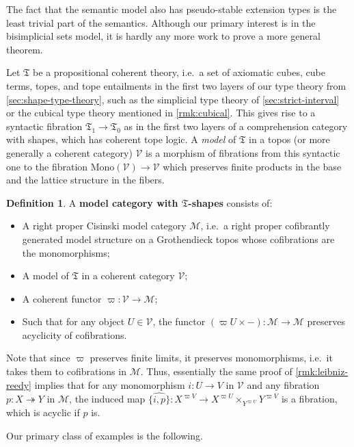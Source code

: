 \documentclass{amsart}
\theoremstyle{plain}
\theoremstyle{definition}
\newtheorem{defn}[thm]{Definition}
\theoremstyle{remark}
\numberwithin{equation}{section}
\newcommand{\M}{\mathcal{M}}
\newcommand{\V}{\mathcal{V}}
\newcommand{\fT}{\mathfrak{T}}
\begin{document}
The fact that the semantic model also has pseudo-stable extension types is the least trivial part of the semantics.
Although our primary interest is in the bisimplicial sets model, it is hardly any more work to prove a more general theorem.

Let $\fT$ be a propositional coherent theory, i.e.\ a set of axiomatic cubes, cube terms, topes, and tope entailments in the first two layers of our type theory from \cref{sec:shape-type-theory}, such as the simplicial type theory of \cref{sec:strict-interval} or the cubical type theory mentioned in \cref{rmk:cubical}.
This gives rise to a syntactic fibration $\fT_1 \to \fT_0$ as in the first two layers of a comprehension category with shapes, which has coherent tope logic.
A \emph{model} of $\fT$ in a topos (or more generally a coherent category) $\V$ is a morphism of fibrations from this syntactic one to the fibration $\mathrm{Mono}(\V) \to \V$ which preserves finite products in the base and the lattice structure in the fibers.

\begin{defn}\label{defn:model-shapes}
  A \textbf{model category with $\fT$-shapes} consists of:
  \begin{itemize}
  \item A right proper Cisinski model category $\M$, i.e.\ a right proper cofibrantly generated model structure on a Grothendieck topos whose cofibrations are the monomorphisms;
  \item A model of $\fT$ in a coherent category $\V$;
  \item A  coherent functor $\varpi : \V\to\M$;
  \item Such that for any object $U\in \V$, the functor $(\varpi U \times -):\M\to\M$ preserves acyclicity of cofibrations.
  \end{itemize}
\end{defn}

Note that since $\varpi$ preserves finite limits, it preserves monomorphisms, i.e.\ it takes them to cofibrations in $\M$.
Thus, essentially the same proof of \cref{rmk:leibniz-reedy} implies that for any monomorphism $i:U\to V$ in $\V$ and any fibration $p:X\twoheadrightarrow Y$ in $\M$, the induced map $\widehat{\{i,p\}} \colon X^{\varpi V} \to X^{\varpi U} \times_{Y^{\varpi U}} Y^{\varpi V}$ is a fibration, which is acyclic if $p$ is.

Our primary class of examples is the following.
\end{document}
